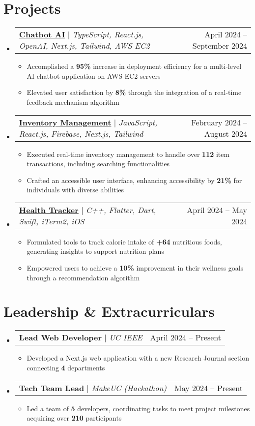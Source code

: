 \documentclass[letterpaper,11pt]{article}
\makeatletter
\newcommand{\resumeItem}[1]{
  \item\small{
    {#1 \vspace{-2pt}}
  }
}
\newcommand{\resumeProjectHeading}[2]{
    \item
    \begin{tabular*}{0.97\textwidth}{l@{\extracolsep{\fill}}r}
      \small#1 & #2 \\
    \end{tabular*}\vspace{-7pt}
}
\newcommand{\resumeSubHeadingListStart}{\begin{itemize}[leftmargin=0.15in, label={}]}
\newcommand{\resumeSubHeadingListEnd}{\end{itemize}}
\newcommand{\resumeItemListStart}{\begin{itemize}}
\newcommand{\resumeItemListEnd}{\end{itemize}\vspace{-5pt}}
\makeatother
\begin{document}
\section{Projects}
    \resumeSubHeadingListStart
      \resumeProjectHeading
          {\href{https://chatbot-ai-indol-five.vercel.app/}{\textbf{Chatbot AI}} $|$ \emph{TypeScript, React.js, OpenAI, Next.js, Tailwind, AWS EC2}}{April 2024 -- September 2024}
          \resumeItemListStart
            \resumeItem{Accomplished a \textbf{95\%} \vspace{-1.2em} increase in deployment efficiency for a multi-level AI chatbot application on AWS EC2 servers}
            \resumeItem{Elevated user satisfaction by \textbf{8\%} through the integration of a real-time feedback mechanism algorithm}
          \resumeItemListEnd
      \resumeProjectHeading
          {\href{https://inventory-management-app-gold.vercel.app/}{\textbf{Inventory Management}} $|$ \emph{JavaScript, React.js, Firebase, Next.js, Tailwind}}{February 2024 -- August 2024}
          \resumeItemListStart
            \resumeItem{Executed real-time inventory management to handle over \textbf{112} item transactions, including searching functionalities}
            \resumeItem{Crafted an accessible user interface, enhancing accessibility by \textbf{21\%} for individuals with diverse abilities}
          \resumeItemListEnd
        \resumeProjectHeading
          {\href{https://github.com/NekruzAsh/BreakfastApp}{\textbf{Health Tracker}} $|$ \emph{C++, Flutter, Dart, Swift, iTerm2, iOS }}{April 2024 -- May 2024}
          \resumeItemListStart
            \resumeItem{Formulated tools to track calorie intake of \textbf{+64} nutritious foods, generating insights to support nutrition plans}
            \resumeItem{Empowered users to achieve a \textbf{10\%} improvement in their wellness goals through a recommendation algorithm}
          \resumeItemListEnd
    \resumeSubHeadingListEnd

\section{Leadership \& Extracurriculars}
  \resumeSubHeadingListStart
      \resumeProjectHeading
          {\textbf{Lead Web Developer} $|$ \emph{UC IEEE}}{April 2024 -- Present}
          \resumeItemListStart
            \resumeItem{Developed a Next.js web application with a new Research Journal section connecting \textbf{4} departments}
          \resumeItemListEnd
        \resumeProjectHeading
          {\textbf{Tech Team Lead} $|$ \emph{MakeUC (Hackathon)}}{May 2024 -- Present}
          \resumeItemListStart
            \resumeItem{Led a team of \textbf{5} developers, coordinating tasks to meet project milestones acquiring over \textbf{210} participants}
        \resumeItemListEnd
    \resumeSubHeadingListEnd
\end{document}
